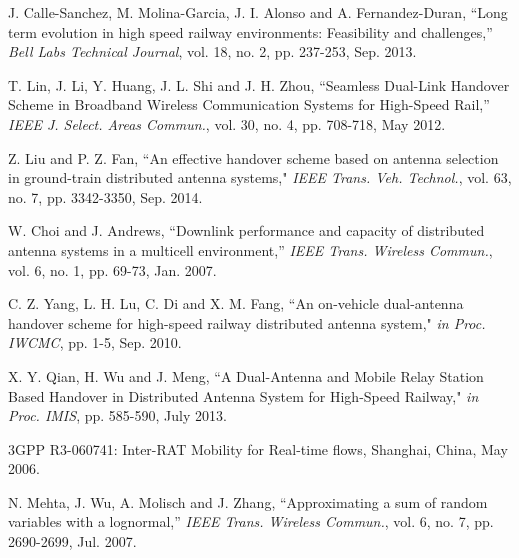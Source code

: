 \documentclass[a4paper,twocolumn,10pt]{IEEEtran}
\begin{document}
\begin{thebibliography}{10}

J. Calle-Sanchez, M. Molina-Garcia, J. I. Alonso and A. Fernandez-Duran, ``Long term evolution in high speed railway environments: Feasibility and challenges,'' \emph{Bell Labs Technical Journal}, vol. 18, no. 2, pp. 237-253, Sep. 2013.

T. Lin, J. Li, Y. Huang, J. L. Shi and J. H. Zhou, ``Seamless Dual-Link Handover Scheme in Broadband Wireless Communication Systems for High-Speed Rail,'' \emph{IEEE J. Select. Areas Commun.}, vol. 30, no. 4, pp. 708-718, May 2012.

Z. Liu and P. Z. Fan, ``An effective handover scheme based on antenna selection in ground-train distributed antenna systems," \emph{IEEE Trans. Veh. Technol.}, vol. 63, no. 7, pp. 3342-3350, Sep. 2014.

W. Choi and J. Andrews, ``Downlink performance and capacity of distributed antenna systems in a multicell environment,'' \emph{IEEE Trans. Wireless Commun.}, vol. 6, no. 1, pp. 69-73, Jan. 2007.

C. Z. Yang, L. H. Lu, C. Di and X. M. Fang, ``An on-vehicle dual-antenna handover scheme for high-speed railway distributed antenna system," \emph{in Proc. IWCMC}, pp. 1-5, Sep. 2010.


X. Y. Qian, H. Wu and J. Meng, ``A Dual-Antenna and Mobile Relay Station Based Handover in Distributed Antenna System for High-Speed Railway," \emph{in Proc. IMIS}, pp. 585-590, July 2013.

3GPP R3-060741: Inter-RAT Mobility for Real-time flows, Shanghai, China, May 2006.

N. Mehta, J. Wu, A. Molisch and J. Zhang, ``Approximating a sum of random variables with a lognormal,'' \emph{IEEE Trans. Wireless Commun.}, vol. 6, no. 7, pp. 2690-2699, Jul. 2007.




\end{thebibliography}
\end{document}
